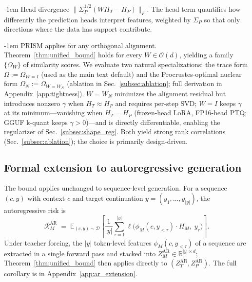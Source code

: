 \documentclass{article}
\makeatletter
\newlength{\paraSpace}
\renewcommand{\paragraph}{\@startsection{paragraph}{4}{\z@}%
  {\paraSpace}{-1em}%
  {\normalfont\normalsize\bfseries}}
\makeatother
\begin{document}
\paragraph{Head divergence $\|\Sigma_P^{1/2}(W H_T - H_P)\|_F$.}
The head term quantifies how differently the prediction heads interpret features, weighted by $\Sigma_P$ so that only directions where the data has support contribute.

\paragraph{PRISM applies for any orthogonal alignment.}
Theorem~\ref{thm:unified_bound} holds for every $W \in \mathcal{O}(d)$, yielding a family $\{\Omega_W\}$ of similarity scores. We evaluate two natural specializations: the trace form $\Omega := \Omega_{W=I}$ (used as the main text default) and the Procrustes-optimal nuclear form $\Omega_N := \Omega_{W=W_N}$ (ablation in Sec.~\ref{subsec:ablation}; full derivation in Appendix~\ref{app:tightness}). $W{=}W_N$ minimizes the alignment residual but introduces nonzero $\gamma$ when $H_T \approx H_P$ and requires per-step SVD; $W{=}I$ keeps $\gamma$ at its minimum---vanishing when $H_T{=}H_P$ (frozen-head LoRA, FP16-head PTQ; GGUF k-quant keeps $\gamma{>}0$)---and is directly differentiable, enabling the regularizer of Sec.~\ref{subsec:shape_reg}. Both yield strong rank correlations (Sec.~\ref{subsec:ablation}); the choice is primarily design-driven.


\subsection{Formal extension to autoregressive generation}
\label{subsec:ar_extension}

The bound applies unchanged to sequence-level generation. For a sequence $(c, y)$ with context $c$ and target continuation $y = (y_1, \ldots, y_{|y|})$, the autoregressive risk is
\begin{equation}
\label{eq:ar_risk}
\mathcal{R}_M^{\mathrm{AR}} \;=\; \mathbb{E}_{(c, y) \sim \mathcal{D}} \!\left[ \frac{1}{|y|} \sum_{\tau=1}^{|y|} \ell\!\big(\phi_M(c, y_{<\tau}) \cdot H_M,\; y_\tau\big) \right].
\end{equation}
Under teacher forcing, the $|y|$ token-level features $\phi_M(c, y_{<\tau})$ of a sequence are extracted in a single forward pass and stacked into $Z_M^{\mathrm{AR}} \in \mathbb{R}^{|y| \times d}$; Theorem~\ref{thm:unified_bound} then applies directly to $(Z_T^{\mathrm{AR}}, Z_P^{\mathrm{AR}})$. The full corollary is in Appendix~\ref{app:ar_extension}.
\end{document}
